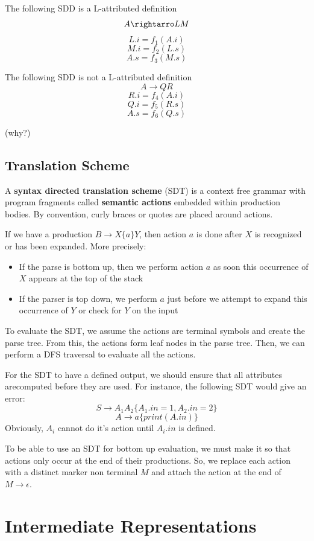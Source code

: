 \documentclass[12pt,letterpaper]{book}
\theoremstyle{definition}
\begin{document}
The following SDD is a L-attributed definition
\[A \rightarro LM\]
\[L.i = f_1(A.i)\]
\[M.i = f_2(L.s)\]
\[A.s = f_3(M.s)\]

The following SDD is not a L-attributed definition
\[A \rightarrow QR\]
\[R.i = f_4(A.i)\]
\[Q.i = f_5(R.s)\]
\[A.s = f_6(Q.s)\]

(why?)

\section{Translation Scheme}

A \textbf{syntax directed translation scheme} (SDT) is a context free grammar with program fragments called \textbf{semantic actions}  embedded within production bodies. By convention, curly braces or quotes are placed around actions.

If we have a production $B \rightarrow X \{a\} Y$, then action $a$ is done after $X$ is recognized or has been expanded. More precisely:

\begin{itemize}
  \item If the parse is bottom up, then we perform action $a$ as soon this occurrence of $X$ appears at the top of the stack
  \item If the parser is top down, we perform $a$ just before we attempt to expand this occurrence of $Y$ or check for $Y$ on the input
\end{itemize}

To evaluate the SDT, we assume the actions are terminal symbols and create the parse tree. From this, the actions form leaf nodes in the parse tree. Then, we can perform a DFS traversal to evaluate all the actions.

For the SDT to have a defined output, we should ensure that all attributes arecomputed before they are used. For instance, the following SDT would give an error:
\[S \rightarrow A_1 A_2 \{A_1.in = 1, A_2.in = 2\}\]
\[A \rightarrow a \{print(A.in)\}\]
Obviously, $A_i$ cannot do it's action until $A_i.in$ is defined.

To be able to use an SDT for bottom up evaluation, we must make it so that actions only occur at the end of their productions. So, we replace each action with a distinct marker non terminal $M$ and attach the action at the end of $M \rightarrow \epsilon$.

\chapter{Intermediate Representations}
\end{document}
